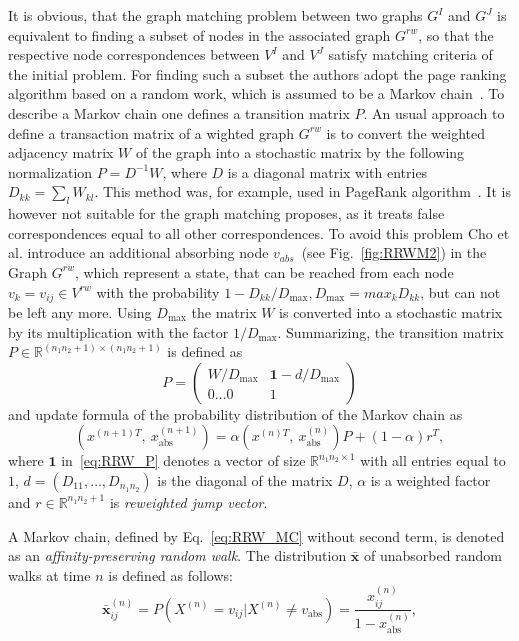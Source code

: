 It is obvious, that the graph matching problem between two graphs $G^I$ and $G^J$ is equivalent to finding a subset of nodes in the associated graph $G^{rw}$, so that the respective node correspondences between $V^I$ and $V^J$ satisfy matching criteria of the initial problem.
For finding such a subset the authors adopt the page ranking algorithm based on a random work, which is assumed to be a Markov chain~\cite{PageRank}. To describe a Markov chain one defines a transition matrix $P$. An usual approach to define a transaction matrix of a wighted graph $G^{rw}$ is to convert the weighted adjacency matrix $W$ of the graph into a stochastic matrix by the following normalization $P=D^{-1}W$, where $D$ is a diagonal matrix with entries $D_{kk}=\sum_{l}{W_{kl}}$. This method was, for example, used in PageRank algorithm~\cite{PageRank}. It is however not suitable for the graph matching proposes, as it treats false correspondences equal to all other correspondences. To avoid this problem Cho et al. introduce an additional absorbing node $v_{abs}$~(see Fig.~\ref{fig:RRWM2}) in the Graph $G^{rw}$, which represent a state, that can be reached from each node $v_k=v_{ij}\in V^{rw}$ with the probability $1-D_{kk}/D_{\text{max}}, D_{\text{max}}=max_{k}D_{kk}$, but can not be left any more. Using $D_\text{max}$ the matrix $W$ is converted into a stochastic matrix by its multiplication with the factor $1/D_{\text{max}}$.
Summarizing, the transition matrix $P\in\mathbb{R}^{(n_1n_2+1)\times(n_1n_2+1)}$ is defined as 
\begin{equation}P=
\begin{pmatrix}
	W/D_{\text{max}} & \mathbf{1}-d/D_{\text{max}} \\
	0\dots 0 & 1
\end{pmatrix} \label{eq:RRW_P}
\end{equation}
and update formula of the probability distribution of the Markov chain as
\begin{equation}\label{eq:RRW_MC}
\left(x^{(n+1)T},\ x_{\text{abs}}^{(n+1)}\right)=\alpha\left(x^{(n)T},\ x_{\text{abs}}^{(n)}\right)P+(1-\alpha)r^T,
\end{equation}
where $\mathbf{1}$ in~\eqref{eq:RRW_P} denotes a vector of size $\mathbb{R}^{n_1n_2\times 1}$ with all entries equal to $1$, $d=(D_{11},\dots,D_{n_1n_2})$ is the diagonal of the matrix $D$, $\alpha$ is a weighted factor and $r\in\mathbb{R}^{n_1n_2+1}$ is \emph{reweighted jump vector}.

A Markov chain, defined by Eq.~\ref{eq:RRW_MC} without second term, is denoted as an \emph{affinity-preserving random walk}. The distribution $\mathbf{\bar{x}}$ of unabsorbed random walks at time $n$ is defined as follows:
\begin{equation}\label{eq:RRWM_x}
\mathbf{\bar{x}}^{(n)}_{ij}=P(X^{(n)}=v_{ij}|X^{(n)}\not=v_{\text{abs}})=\frac{x^{(n)}_{ij}}{1-x^{(n)}_{\text{abs}}}, 
\end{equation}


